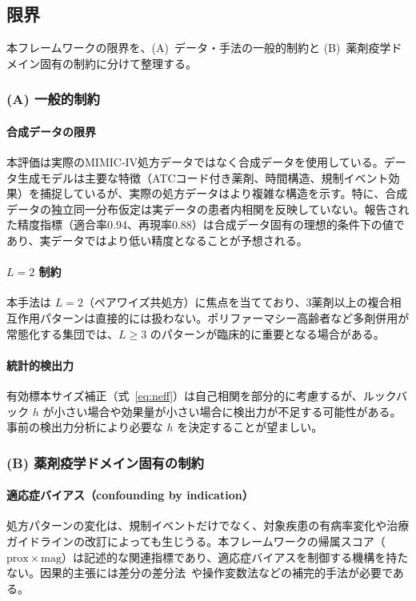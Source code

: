 \documentclass[11pt]{article}
\begin{document}
\subsection{限界}\label{sec:limitations}

本フレームワークの限界を、(A)~データ・手法の一般的制約と (B)~薬剤疫学ドメイン固有の制約に分けて整理する。

\subsubsection*{(A) 一般的制約}

\paragraph{合成データの限界}
本評価は実際のMIMIC-IV処方データではなく合成データを使用している。データ生成モデルは主要な特徴（ATCコード付き薬剤、時間構造、規制イベント効果）を捕捉しているが、実際の処方データはより複雑な構造を示す。特に、合成データの独立同一分布仮定は実データの患者内相関を反映していない。報告された精度指標（適合率0.94、再現率0.88）は合成データ固有の理想的条件下の値であり、実データではより低い精度となることが予想される。

\paragraph{$L = 2$ 制約}
本手法は $L = 2$（ペアワイズ共処方）に焦点を当てており、3薬剤以上の複合相互作用パターンは直接的には扱わない。ポリファーマシー高齢者など多剤併用が常態化する集団では、$L \geq 3$ のパターンが臨床的に重要となる場合がある。

\paragraph{統計的検出力}
有効標本サイズ補正（式~\ref{eq:neff}）は自己相関を部分的に考慮するが、ルックバック $h$ が小さい場合や効果量が小さい場合に検出力が不足する可能性がある。事前の検出力分析により必要な $h$ を決定することが望ましい。

\subsubsection*{(B) 薬剤疫学ドメイン固有の制約}

\paragraph{適応症バイアス（confounding by indication）}
処方パターンの変化は、規制イベントだけでなく、対象疾患の有病率変化や治療ガイドラインの改訂によっても生じうる。本フレームワークの帰属スコア（$\mathrm{prox} \times \mathrm{mag}$）は記述的な関連指標であり、適応症バイアスを制御する機構を持たない。因果的主張には差分の差分法~\citep{dimick2014did}や操作変数法などの補完的手法が必要である。
\end{document}

